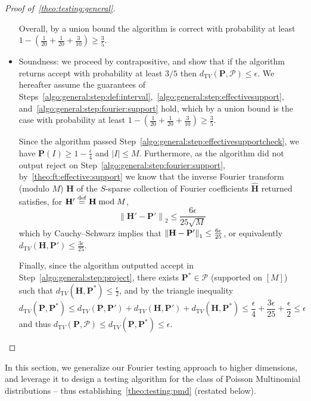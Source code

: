 \documentclass[11pt]{article}
\makeatletter
\renewcommand{\section}{\@startsection{section}{1}{0pt}{-12pt}{5pt}{\large\bf}}
\theoremstyle{definition}
\newcommand{\p}{\mathbf{P}}
\newcommand{\h}{\mathbf{H}}
\newcommand{\dtv}{d_{\mathrm TV}}
\newcommand{\eps}{\epsilon}
\newcommand{\abs}[1]{\lvert#1\rvert}
\newcommand{\norm}[1]{\lVert#1\rVert}
\newcommand{\eqdef}{\stackrel{{\mathrm {\footnotesize def}}}{=}}
\newcommand{\normtwo}[1]{{\norm{#1}}_2}
\renewcommand{\abs}[1]{\left\lvert #1 \right\rvert}
\newcommand{\accept}{\textsf{accept}\xspace}
\newcommand{\reject}{\textsf{reject}\xspace}
\newcommand{\fourier}[1]{\widehat{#1}}
\makeatother
\begin{document}
\begin{proof}[Proof of~\cref{theo:testing:general}]
\begin{itemize}
      Overall, by a union bound the algorithm is correct with probability at least $1-(\frac{1}{20}+\frac{1}{20}+\frac{3}{10}) \geq \frac{3}{5}$.
      
      \item Soundness: we proceed by contrapositive, and show that if the algorithm returns \accept with probability at least $3/5$ then $\dtv(\p,\mathcal{P}) \leq \eps$. 
We hereafter assume the guarantees of Steps~\ref{algo:general:step:def:interval},~\ref{algo:general:step:effectivesupport}, and~\ref{algo:general:step:fourier:support} hold, which by a union bound is the case with probability at least $1-(\frac{1}{20}+\frac{1}{20}+\frac{3}{10}) \geq \frac{3}{5}$.

Since the algorithm passed Step~\ref{algo:general:step:effectivesupportcheck}, we have $\p(I)\geq 1 - \frac{\eps}{4}$ and $\abs{I}\leq M$. Furthermore, as the algorithm did not output \reject on Step~\ref{algo:general:step:fourier:support}, by~\cref{theo:ft:effective:support} we know that the inverse Fourier transform (modulo $M$) $\h$ of the $S$-sparse collection of Fourier coefficients $\fourier{\h}$ returned satisfies, for $\h'\eqdef \h \bmod M$,
  \[
       \normtwo{\h'-\p'} \leq \frac{6\eps}{25\sqrt{M}}
  \]
  which by Cauchy--Schwarz implies that $\normone{\h-\p'}\leq \frac{6\eps}{25}$, or equivalently $\dtv(\h,\p')\leq \frac{3\eps}{25}$.
  
  Finally, since the algorithm outputted \accept in Step~\ref{algo:general:step:project}, there exists $\p^\ast\in\mathcal{P}$ (supported on $[M]$) such that $\dtv(\h,\p^\ast)\leq \frac{\eps}{2}$, and by the triangle inequality
  \[
      \dtv(\p,\p^\ast) \leq \dtv(\p,\p') + \dtv(\h,\p') + \dtv(\h,\p^\ast) \leq \frac{\eps}{4} + \frac{3\eps}{25} + \frac{\eps}{2} \leq \eps
  \]
  and thus $\dtv(\p,\mathcal{P}) \leq \dtv(\p,\p^\ast) \leq \eps$.
      
  \end{itemize}
\end{proof}

 
\section{The PMD Tester}\label{sec:pmd:testing}
In this section, we generalize our Fourier testing approach to higher dimensions, and leverage it to design a testing algorithm for the class of Poisson Multinomial distributions -- thus establishing~\cref{theo:testing:pmd} (restated below).
\end{document}

